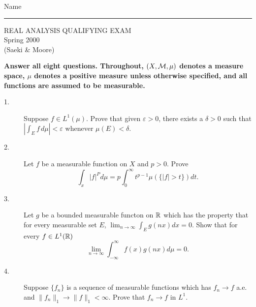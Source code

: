 \documentclass[bbb]{report}
\def\ds{\displaystyle}
\def\R{{\Bbb R}}
\begin{document}
\begin{Large}

\hfill Name \rule{2.5in}{.01in}
\par
\vspace{.25in}

\begin{center}
   REAL ANALYSIS QUALIFYING EXAM \\
  Spring 2000\\
   (Saeki \& Moore) \\
\end{center}


\vspace{.1in}

\end{Large}

\begin{large}


{\bf Answer all eight questions.
Throughout, $(X, {\cal M} ,\mu)$ denotes a measure space,
$\mu$ denotes a positive measure unless otherwise specified, and all
functions are assumed to be measurable.}

\vspace{.25in}


\begin{description}

\item[1.]
Suppose $f\in L^1(\mu)$. Prove that given $\varepsilon>0$,
there exists a $\delta>0$ such that $|\ds\int_E f\,d\mu|<\varepsilon$
whenever $\mu(E)<\delta$.

\vspace{.15in}

\item[2.]
Let $f$ be a measurable function on $X$ and $p>0$. Prove
$$ \int_x|f|^Pd\mu=p\int^\infty_0 t^{p-1} \mu(\{|f|>t\})dt.$$

\vspace{.15in}

\item[3.]
Let $g$ be a bounded measurable functon on $\R$ which has the
property that for every measurable set $E$,
$\ds\lim_{n\to\infty}\ds\int_Eg(nx)dx=0$.
Show that for every $f\in L^1(\R)$
$$ \lim_{n\to\infty} \int^\infty_{-\infty} f(x) g(nx)d\mu=0.$$

\vspace{.15in}

\item[4.]
Suppose $\{f_n\}$ is a sequence of measurable functions which has
$f_n\to f$ a.e. and
$ \|f_n\|_1\to \|f\|_1<\infty$.
Prove that $f_n\to f$ in $L^1$.


\end{description}
\end{large}
\end{document}
